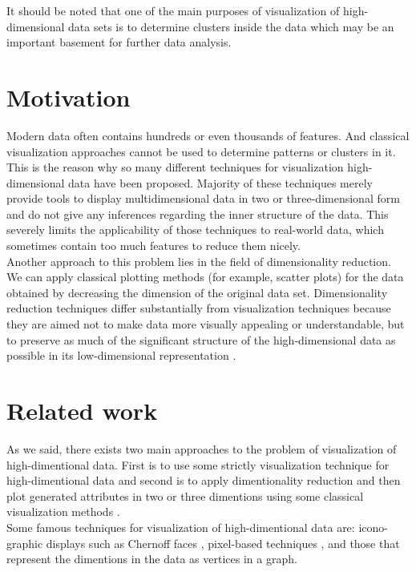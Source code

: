 It should be noted that one of the main purposes of visualization of high-dimensional data sets is to determine clusters inside the data which may be an important basement for further data analysis.


\section{Motivation}

Modern data often contains hundreds or even thousands of features. And classical visualization approaches cannot be used to determine patterns or clusters in it. This is the reason why so many different techniques for visualization high-dimensional data have been proposed. Majority of these techniques merely provide tools to display multidimensional data in two or three-dimensional form and do not give any inferences regarding the inner structure of the data. This severely limits the applicability of those techniques to real-world data, which sometimes contain too much features to reduce them nicely.\\

Another approach to this problem lies in the field of dimensionality reduction. We can apply classical plotting methods (for example, scatter plots) for the data obtained by decreasing the dimension of the original data set. Dimensionality reduction techniques differ substantially from visualization techniques because they are aimed not to make data more visually appealing or understandable, but to preserve as much of the significant structure of the high-dimensional data as possible in its low-dimensional representation \cite{tsnearticle}.

\section{Related work}

As we said, there exists two main approaches to the problem of visualization
of high-dimentional data. First is to use some strictly visualization technique
for high-dimentional data and second is to apply dimentionality reduction and then plot generated attributes in two or three dimentions using some classical
visualization methods \cite{tsnearticle}. \\


Some famous techniques for visualization of high-dimentional data are: icono-
graphic displays such as Chernoff faces \cite{chernoff}, pixel-based techniques \cite{keim}, and those that
represent the dimentions in the data as vertices in a graph.\\


